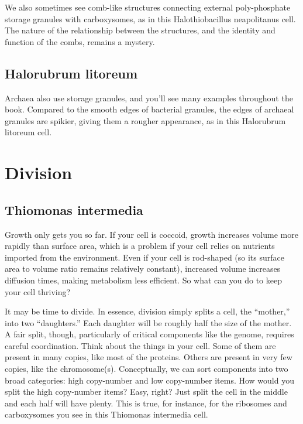 \documentclass[]{tufte-book}
\begin{document}
We also sometimes see comb-like structures connecting external
poly-phosphate storage granules with carboxysomes, as in this
Halothiobacillus neapolitanus cell. The nature of the relationship
between the structures, and the identity and function of the combs,
remains a mystery.

\section{Halorubrum litoreum}\label{halorubrum-litoreum}

Archaea also use storage granules, and you'll see many examples
throughout the book. Compared to the smooth edges of bacterial granules,
the edges of archaeal granules are spikier, giving them a rougher
appearance, as in this Halorubrum litoreum cell.

\chapter{Division}\label{division}

\section{Thiomonas intermedia}\label{thiomonas-intermedia-1}

Growth only gets you so far. If your cell is coccoid, growth increases
volume more rapidly than surface area, which is a problem if your cell
relies on nutrients imported from the environment. Even if your cell is
rod-shaped (so its surface area to volume ratio remains relatively
constant), increased volume increases diffusion times, making metabolism
less efficient. So what can you do to keep your cell thriving?

It may be time to divide. In essence, division simply splits a cell, the
``mother,'' into two ``daughters.'' Each daughter will be roughly half
the size of the mother. A fair split, though, particularly of critical
components like the genome, requires careful coordination. Think about
the things in your cell. Some of them are present in many copies, like
most of the proteins. Others are present in very few copies, like the
chromosome(s). Conceptually, we can sort components into two broad
categories: high copy-number and low copy-number items. How would you
split the high copy-number items? Easy, right? Just split the cell in
the middle and each half will have plenty. This is true, for instance,
for the ribosomes and carboxysomes you see in this Thiomonas intermedia
cell.
\end{document}
